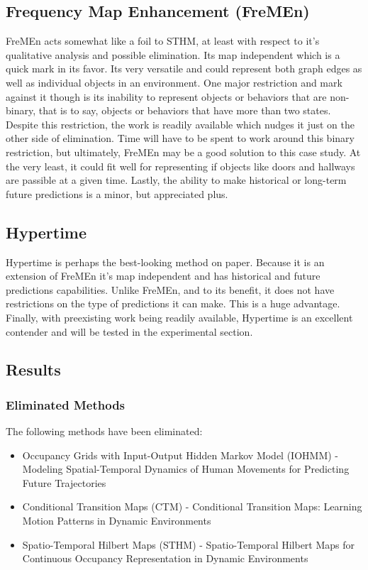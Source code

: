   \subsection { Frequency Map Enhancement (FreMEn) }
  FreMEn acts somewhat like a foil to STHM, at least with respect to it's
  qualitative analysis and possible elimination. Its map independent which is
  a quick mark in its favor. Its very versatile and could represent both graph
  edges as well as individual objects in an environment. One major restriction
  and mark against it though is its inability to represent objects or behaviors
  that are non-binary, that is to say, objects or behaviors that have more than
  two states. Despite this restriction, the work is readily available which
  nudges it just on the other side of elimination. Time will have to be spent
  to work around this binary restriction, but ultimately, FreMEn may be a good
  solution to this case study. At the very least, it could fit well for
  representing if objects like doors and hallways are passible at a given time.
  Lastly, the ability to make historical or long-term future predictions is
  a minor, but appreciated plus.

  \subsection { Hypertime }
  Hypertime is perhaps the best-looking method on paper. Because it is an
  extension of FreMEn it's map independent
  and has historical and future predictions capabilities. Unlike FreMEn, and to its benefit, it does not have
  restrictions on the type of predictions it can make. This is
  a huge advantage. Finally, with preexisting work being readily available, Hypertime
  is an excellent contender and will be tested in the experimental section.

  \subsection{ Results }
  \subsubsection{ Eliminated Methods }
  The following methods have been eliminated:
  \begin{itemize}
    \item Occupancy Grids with Input-Output Hidden Markov Model (IOHMM) - Modeling Spatial-Temporal Dynamics of Human Movements for Predicting Future Trajectories \cite{Wang2015}
    \item Conditional Transition Maps (CTM) - Conditional Transition Maps: Learning Motion Patterns in Dynamic Environments \cite{Kucner2013}
    \item Spatio-Temporal Hilbert Maps (STHM) - Spatio-Temporal Hilbert Maps for Continuous Occupancy Representation in Dynamic Environments \cite{Senanayake2016}
  \end{itemize}

